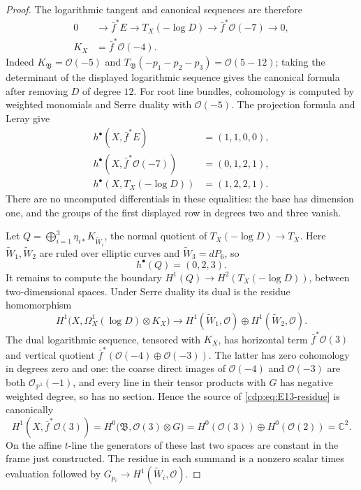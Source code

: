 \begin{proof}
The logarithmic tangent and canonical sequences are therefore
\[
\begin{split}
 0&\longrightarrow\bar f^*E\longrightarrow T_X(-\log D)
 \longrightarrow\bar f^*\mathcal O(-7)\longrightarrow0,\\
 K_X&=\bar f^*\mathcal O(-4).
\end{split}
\]
Indeed $K_{\mathfrak B}=\mathcal O(-5)$ and
$T_{\mathfrak B}(-p_1-p_2-p_3)=\mathcal O(5-12)$; taking the
determinant of the displayed logarithmic sequence gives the
canonical formula after removing $D$ of degree $12$.
For root line bundles, cohomology is computed by weighted monomials
and Serre duality with $\mathcal O(-5)$. The projection formula and
Leray give
\[
\begin{split}
 h^\bullet(X,\bar f^*E)&=(1,1,0,0),\\
 h^\bullet(X,\bar f^*\mathcal O(-7))&=(0,1,2,1),\\
 h^\bullet(X,T_X(-\log D))&=(1,2,2,1).
\end{split}
\]
There are no uncomputed differentials in these equalities: the base
has dimension one, and the groups of the first displayed row in
degrees two and three vanish.

Let $Q=\bigoplus_{i=1}^3\eta_{i*}K_{\widetilde W_i}$, the normal
quotient of $T_X(-\log D)\to T_X$. Here
$\widetilde W_1,\widetilde W_2$ are ruled over elliptic curves and
$\widetilde W_3=dP_6$, so
\[
 h^\bullet(Q)=(0,2,3).
\]
It remains to compute the boundary
$H^1(Q)\to H^2(T_X(-\log D))$, between two-dimensional spaces.
Under Serre duality its dual is the residue homomorphism
\begin{equation}\label{cdp:eq:E13-residue}
 H^1\bigl(X,\Omega_X^1(\log D)\otimes K_X\bigr)
 \longrightarrow
 H^1(\widetilde W_1,\mathcal O)\oplus
 H^1(\widetilde W_2,\mathcal O).
\end{equation}
The dual logarithmic sequence, tensored with $K_X$, has horizontal
term $\bar f^*\mathcal O(3)$ and vertical quotient
$\bar f^*(\mathcal O(-4)\oplus\mathcal O(-3))$.
The latter has zero cohomology in degrees zero and one: the coarse
direct images of $\mathcal O(-4)$ and $\mathcal O(-3)$ are both
$\mathcal O_{\mathbb P^1}(-1)$, and every line in their tensor
products with $G$ has negative weighted degree, so has no section.
Hence the
source of \eqref{cdp:eq:E13-residue} is canonically
\[
 H^1(X,\bar f^*\mathcal O(3))
 =H^0\bigl(\mathfrak B,\mathcal O(3)\otimes G\bigr)
 =H^0(\mathcal O(3))\oplus H^0(\mathcal O(2))=\mathbb C^2.
\]
On the affine $t$-line the generators of these last two spaces are
constant in the frame just constructed. The residue in each
summand is a nonzero scalar times evaluation followed by
$G_{p_i}\to H^1(\widetilde W_i,\mathcal O)$.


\end{proof}
